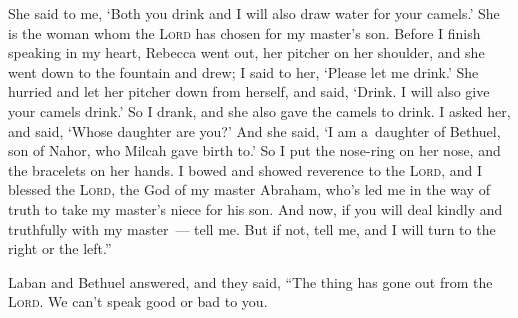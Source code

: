 \begin{inparaenum}
     She said to me, `Both you drink and I will also draw water for your camels.' She is the woman whom the \textsc{Lord} has chosen for my master's son.%
     Before I finish speaking in my heart, Rebecca went out, her pitcher on her shoulder, and she went down to the fountain and drew; I said to her, `Please let me drink.'%
     She hurried and let her pitcher down from herself, and said, `Drink. I will also give your camels drink.' So I drank, and she also gave the camels to drink.%
     I asked her, and said, `Whose daughter are you?' And she said, `I am a\understood\ daughter of Bethuel, son of Nahor, who Milcah gave birth to.' So I put the nose-ring on her nose, and the bracelets on her hands.%
     I bowed and showed reverence to the \textsc{Lord}, and I blessed the \textsc{Lord}, the God of my master Abraham, who's led me in the way of truth to take my master's niece for his son.%
     And now, if you will deal kindly and truthfully with my master~--- tell me. But if not, tell me, and I will turn to the right or the left.''%
    
     Laban and Bethuel answered, and they said, ``The thing has gone out from the \textsc{Lord}. We can't speak good or bad to you.%
     \smallskip%
    
    \pvdb{}{}%
    
    \pvdb{}{}%
    
\end{inparaenum}
